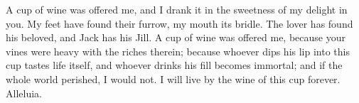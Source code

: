 A cup of wine was offered me, and I drank it in the sweetness of my delight in you. My feet have found their furrow, my mouth its bridle. The lover has found his beloved, and Jack has his Jill. A cup of wine was offered me, because your vines were heavy with the riches therein; because whoever dips his lip into this cup tastes life itself, and whoever drinks his fill becomes immortal; and if the whole world perished, I would not. I will live by the wine of this cup forever. Alleluia.
